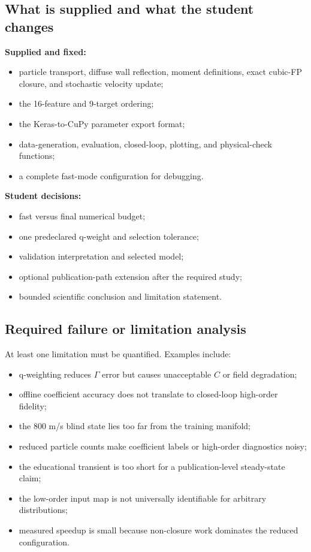 \documentclass[11pt]{article}
\begin{document}
\subsection{What is supplied and what the student changes}
\textbf{Supplied and fixed:}
\begin{itemize}
\item particle transport, diffuse wall reflection, moment definitions, exact cubic-FP closure, and stochastic velocity update;
\item the 16-feature and 9-target ordering;
\item the Keras-to-CuPy parameter export format;
\item data-generation, evaluation, closed-loop, plotting, and physical-check functions;
\item a complete fast-mode configuration for debugging.
\end{itemize}

\textbf{Student decisions:}
\begin{itemize}
\item fast versus final numerical budget;
\item one predeclared q-weight and selection tolerance;
\item validation interpretation and selected model;
\item optional publication-path extension after the required study;
\item bounded scientific conclusion and limitation statement.
\end{itemize}

\subsection{Required failure or limitation analysis}
At least one limitation must be quantified. Examples include:
\begin{itemize}
\item q-weighting reduces $\Gamma$ error but causes unacceptable $C$ or field degradation;
\item offline coefficient accuracy does not translate to closed-loop high-order fidelity;
\item the 800 m/s blind state lies too far from the training manifold;
\item reduced particle counts make coefficient labels or high-order diagnostics noisy;
\item the educational transient is too short for a publication-level steady-state claim;
\item the low-order input map is not universally identifiable for arbitrary distributions;
\item measured speedup is small because non-closure work dominates the reduced configuration.
\end{itemize}
\end{document}
